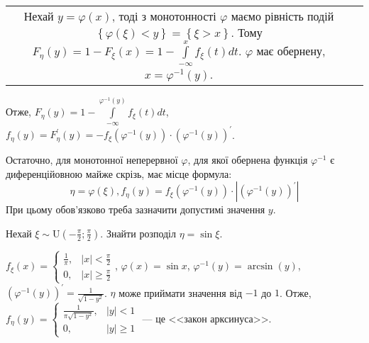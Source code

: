 \begin{enumerate}
\begin{tabular}{c p{8.8cm}}
        Нехай $y = \varphi(x)$, тоді з монотонності $\varphi$ маємо рівність подій $\left\{ \varphi(\xi) < y\right\} = \left\{ \xi > x\right\}$.
        Тому $F_\eta (y) = 1 - F_\xi (x) = 1 - \int\limits_{-\infty}^x f_\xi(t) dt$. $\varphi$ має обернену, $x = \varphi^{-1} (y)$.
    \end{tabular}

    Отже, $F_\eta (y) = 1 - \int\limits_{-\infty}^{\varphi^{-1} (y)} f_\xi(t) dt$,
    $f_\eta(y) = F^\prime_\eta (y) = - f_\xi\left(\varphi^{-1} (y)\right) \cdot \left(\varphi^{-1} (y) \right)^{\prime}$.
\end{enumerate}

\noindent Остаточно, для монотонної неперервної $\varphi$,
для якої обернена функція $\varphi^{-1}$ є диференційовною майже скрізь, має місце формула:
\begin{equation}\label{eq:phi_xi}
    \eta = \varphi(\xi), f_\eta(y) = f_\xi\left(\varphi^{-1} (y)\right) \cdot \left|\left(\varphi^{-1} (y) \right)^{\prime}\right|
\end{equation}
При цьому обов'язково треба зазначити допустимі значення $y$.

\begin{example}
    Нехай $\xi \sim \mathrm{U}(-\frac{\pi}{2}; \frac{\pi}{2})$. Знайти розподіл $\eta = \sin \xi$.

    \noindent $f_\xi(x) = \begin{cases}
        \frac{1}{\pi}, & |x| < \frac{\pi}{2} \\
        0, & |x| \geq \frac{\pi}{2}
    \end{cases}$, $\varphi(x) = \sin x$, $\varphi^{-1} (y) = \arcsin(y)$, $\left(\varphi^{-1} (y)\right)^{\prime} = \frac{1}{\sqrt{1-y^2}}$.
    $\eta$ може приймати значення від $-1$ до $1$. 
    Отже, $f_\eta(y) = \begin{cases}
        \frac{1}{\pi\sqrt{1-y^2}}, & |y| < 1 \\
        0, & |y| \geq 1
    \end{cases}$ --- це <<закон арксинуса>>.
\end{example}

